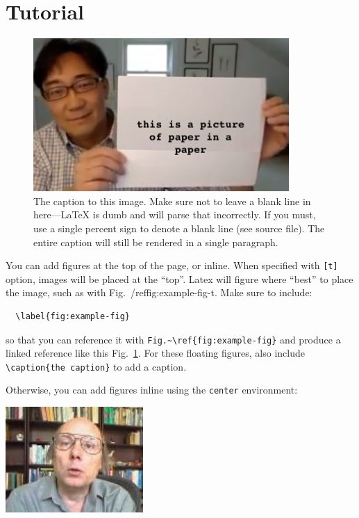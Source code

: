\section{Tutorial}

\begin{figure}[t]
\centering
\includegraphics[width=0.7\columnwidth]{figs/figure}
\caption{
  The caption to this image.
  Make sure not to leave a blank line in here---LaTeX is dumb and will parse
  that incorrectly.
  If you must, use a single percent sign to denote a blank line (see source
  file). The entire caption will still be rendered in a single paragraph.
}
\label{fig:example-fig-t}
\end{figure}

You can add figures at the top of the page, or inline. When specified with
\verb|[t]| option, images will be placed at the ``top''. Latex will figure where
``best'' to place the image, such as with Fig.~/ref{fig:example-fig-t}.
Make sure to include:
\begin{verbatim}
  \label{fig:example-fig}
\end{verbatim}
so that you can reference it with \verb|Fig.~\ref{fig:example-fig}|
and produce a linked reference like this Fig.~\ref{fig:example-fig-t}.
For these floating figures, also include \verb|\caption{the caption}| to add a
caption.

Otherwise, you can add figures inline using the \verb|center| environment:

\begin{center}
\includegraphics[width=0.3\columnwidth]{figs/figure2}
\end{center}

